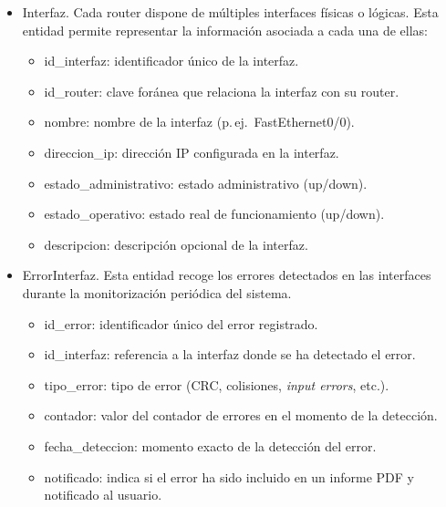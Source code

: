 \begin{itemize}
    \item Interfaz. Cada router dispone de múltiples interfaces físicas o lógicas. Esta entidad permite representar la información asociada a cada una de ellas:
    \begin{itemize}
        \item id\_interfaz: identificador único de la interfaz.
        \item id\_router: clave foránea que relaciona la interfaz con su router.
        \item nombre: nombre de la interfaz (p.\,ej.\ FastEthernet0/0).
        \item direccion\_ip: dirección IP configurada en la interfaz.
        \item estado\_administrativo: estado administrativo (up/down).
        \item estado\_operativo: estado real de funcionamiento (up/down).
        \item descripcion: descripción opcional de la interfaz.
    \end{itemize}

    \item ErrorInterfaz. Esta entidad recoge los errores detectados en las interfaces durante la monitorización periódica del sistema.
    \begin{itemize}
        \item id\_error: identificador único del error registrado.
        \item id\_interfaz: referencia a la interfaz donde se ha detectado el error.
        \item tipo\_error: tipo de error (CRC, colisiones, \textit{input errors}, etc.).
        \item contador: valor del contador de errores en el momento de la detección.
        \item fecha\_deteccion: momento exacto de la detección del error.
        \item notificado: indica si el error ha sido incluido en un informe PDF y notificado al usuario.
    \end{itemize}

\end{itemize}


